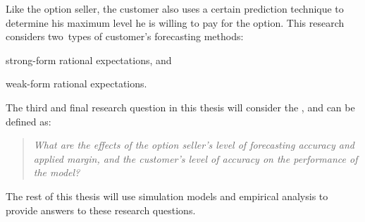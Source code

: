 Like the option seller, the customer also uses a certain prediction technique to determine his maximum level he is willing to pay for the option. This research considers two~types of customer's forecasting methods:
\begin{compactitem}
    \item strong-form rational expectations, and
    \item weak-form rational expectations.
\end{compactitem}

\noindent
The third and final research question in this thesis will consider the , and can be defined as:

\begin{quote}\emph{What are the effects of the option seller's level of forecasting accuracy and applied margin, and the customer's level of accuracy on the performance of the model?}\end{quote}

The rest of this thesis will use simulation models and empirical analysis to provide answers to these research questions.